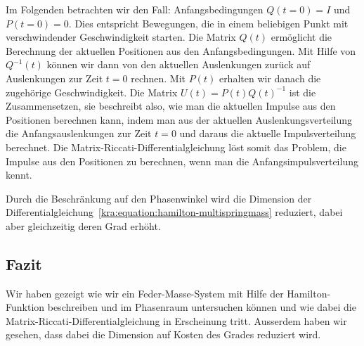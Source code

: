 Im Folgenden betrachten wir den Fall: Anfangsbedingungen $Q(t=0)=I$ und
$P(t=0)=0$.
Dies entspricht Bewegungen, die in einem beliebigen Punkt mit verschwindender
Geschwindigkeit starten.
Die Matrix $Q(t)$ ermöglicht die Berechnung der aktuellen Positionen aus
den Anfangsbedingungen.
Mit Hilfe von $Q^{-1}(t)$ können wir dann von den aktuellen Auslenkungen
zurück auf Auslenkungen zur Zeit $t=0$ rechnen.
Mit $P(t)$ erhalten wir danach die zugehörige Geschwindigkeit.
Die Matrix $U(t)=P(t)Q(t)^{-1}$ ist die Zusammensetzen, sie beschreibt also,
wie man die aktuellen Impulse aus den Positionen berechnen kann,
indem man aus der aktuellen Auslenkungsverteilung die Anfangsauslenkungen
zur Zeit $t=0$ und daraus die aktuelle Impulsverteilung berechnet.
Die Matrix-Riccati-Differentialgleichung löst somit das Problem, die
Impulse aus den Positionen zu berechnen, wenn man die
Anfangsimpulsverteilung kennt.

Durch die Beschränkung auf den Phasenwinkel wird die Dimension der
Differentialgleichung~\eqref{kra:equation:hamilton-multispringmass}
reduziert, dabei aber gleichzeitig deren Grad erhöht.

\subsection{Fazit}
Wir haben gezeigt wie wir ein Feder-Masse-System mit Hilfe der
Hamilton-Funktion beschreiben und im Phasenraum untersuchen können
und wie dabei die Matrix-Riccati-Differentialgleichung in Erscheinung
tritt.
Ausserdem haben wir gesehen, dass dabei die Dimension auf Kosten
des Grades reduziert wird.

